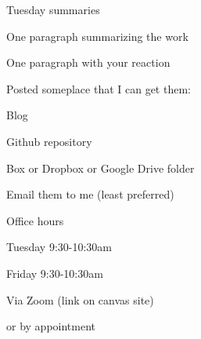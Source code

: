 \documentclass[aspectratio=169,12pt,t]{beamer}
\begin{document}
\begin{frame}{Tuesday summaries}

  \bbi
\item One paragraph summarizing the work
\item One paragraph with your reaction
\item Posted someplace that I can get them:
  \bi
\item Blog
\item Github repository
\item Box or Dropbox or Google Drive folder
\item Email them to me (least preferred)
  \ei
\ei

\end{frame}


\begin{frame}{Office hours}

  \bbi
\item Tuesday 9:30-10:30am
\item Friday 9:30-10:30am
\item Via Zoom (link on canvas site)
\item \hilit or by appointment
\ei

\end{frame}
\end{document}
